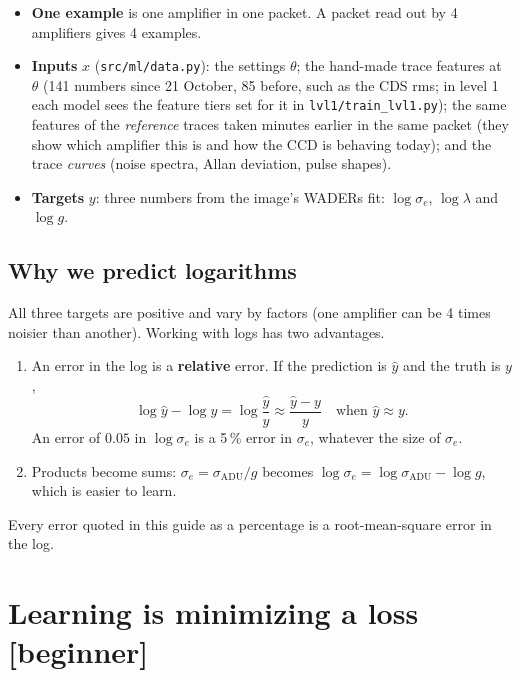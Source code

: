 \documentclass[11pt]{article}
\newcommand{\code}[1]{\texttt{#1}}
\newcommand{\level}[1]{\hfill{\normalfont\small\color{black!60}[#1]}}
\begin{document}
\begin{ours}
\begin{itemize}
\item \textbf{One example} is one amplifier in one packet. A packet read out by 4 amplifiers gives 4 examples.
\item \textbf{Inputs} $x$ (\code{src/ml/data.py}): the settings $\theta$; the hand-made trace features at $\theta$ (141 numbers since 21 October, 85 before, such as the
  CDS rms; in level 1 each model sees the feature tiers set for it in \code{lvl1/train\_lvl1.py}); the same features of the \emph{reference} traces taken minutes earlier in the same packet (they show which amplifier
  this is and how the CCD is behaving today); and the trace \emph{curves} (noise spectra, Allan deviation, pulse shapes).
\item \textbf{Targets} $y$: three numbers from the image's WADERs fit: $\log\sigma_e$, $\log\lambda$ and $\log g$.
\end{itemize}
\end{ours}

\subsection{Why we predict logarithms}
All three targets are positive and vary by factors (one amplifier can be 4 times noisier than another). Working with logs has
two advantages.
\begin{enumerate}
\item An error in the log is a \textbf{relative} error. If the prediction is $\hat y$ and the truth is $y$,
\begin{equation}
\log \hat y - \log y = \log\frac{\hat y}{y} \approx \frac{\hat y - y}{y}\quad\text{when } \hat y \approx y .
\end{equation}
An error of $0.05$ in $\log\sigma_e$ is a 5\,\% error in $\sigma_e$, whatever the size of $\sigma_e$.
\item Products become sums: $\sigma_e = \sigma_\text{ADU}/g$ becomes $\log\sigma_e = \log\sigma_\text{ADU} - \log g$, which is easier
  to learn.
\end{enumerate}
Every error quoted in this guide as a percentage is a root-mean-square error in the log.

\section{Learning is minimizing a loss \level{beginner}}
\label{sec:loss}
\end{document}
